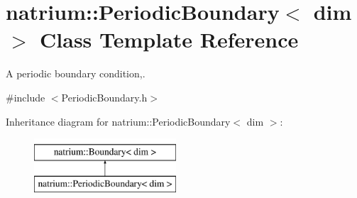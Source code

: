 \hypertarget{classnatrium_1_1PeriodicBoundary}{\section{natrium\-:\-:Periodic\-Boundary$<$ dim $>$ Class Template Reference}
\label{classnatrium_1_1PeriodicBoundary}
}


A periodic boundary condition,.  




{\ttfamily \#include $<$Periodic\-Boundary.\-h$>$}

Inheritance diagram for natrium\-:\-:Periodic\-Boundary$<$ dim $>$\-:\begin{figure}[H]
\begin{center}
\leavevmode
\includegraphics[height=2.000000cm]{classnatrium_1_1PeriodicBoundary}
\end{center}
\end{figure}
